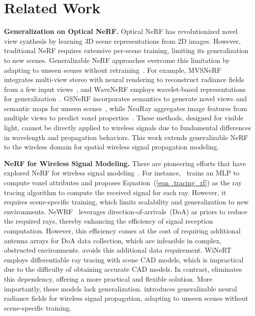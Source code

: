
\section{Related Work}\label{sec_relatedWork}

\textbf{Generalization on Optical NeRF.}  
Optical NeRF has revolutionized novel view synthesis by learning 3D scene representations from 2D images. 
However, traditional NeRF requires extensive per-scene training, limiting its generalization to new scenes. Generalizable NeRF approaches overcome this limitation by adapting to unseen scenes without retraining~\cite{trevithick2020grf, chen2021mvsnerf, 10377995, chou2024gsnerf, tian2023mononerf, liu2022neural}. 
For example, MVSNeRF integrates multi-view stereo with neural rendering to reconstruct radiance fields from a few input views~\cite{chen2021mvsnerf}, and WaveNeRF employs wavelet-based representations for generalization~\cite{10377995}. 
GSNeRF incorporates semantics to generate novel views and semantic maps for unseen scenes~\cite{chou2024gsnerf}, while NeuRay aggregates image features from multiple views to predict voxel properties~\cite{liu2022neural}. 
These methods, designed for visible light, cannot be directly applied to wireless signals due to fundamental differences in wavelength and propagation behaviors.
This work extends generalizable NeRF to the wireless domain for spatial wireless signal propagation modeling.


\textbf{NeRF for Wireless Signal Modeling.}
There are pioneering efforts that have explored NeRF for wireless signal modeling~\cite{zhao2023nerf, orekondy2022winert}.
For instance, \nerft~trains an MLP to compute voxel attributes and proposes Equation~(\ref{eqn_tracing_rf}) as the ray tracing algorithm to compute the received signal for each ray. 
However, it requires scene-specific training, which limits scalability and generalization to new environments.
NeWRF~\cite{lunewrf} leverages direction-of-arrivals~(DoA) as priors to reduce the required rays, thereby enhancing the efficiency of signal reception computation. 
However, this efficiency comes at the cost of requiring additional antenna arrays for DoA data collection, which are infeasible in complex, obstructed environments.
\ourSystem avoids this additional data requirement.
WiNeRT~\cite{orekondy2022winert} employs differentiable ray tracing with scene CAD models, which is impractical due to the difficulty of obtaining accurate CAD models. 
In contrast, \ourSystem eliminates this dependency, offering a more practical and flexible solution.
More importantly, these models lack generalization. 
\ourSystem introduces generalizable neural radiance fields for wireless signal propagation, adapting to unseen scenes without scene-specific training.


